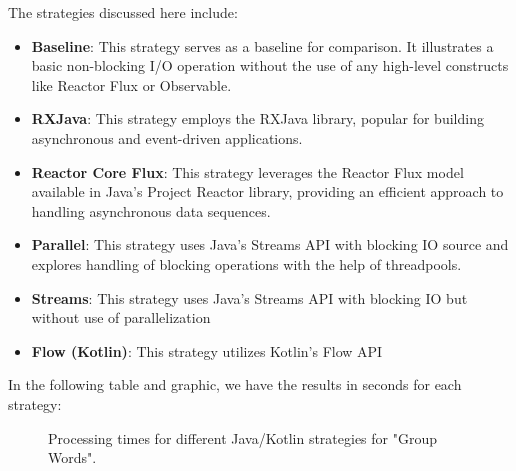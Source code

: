    The strategies discussed here include:
    \begin{itemize}
        \item \textbf{Baseline}: This strategy serves as a baseline for comparison. It illustrates a basic non-blocking I/O operation without the use of any high-level constructs like Reactor Flux or Observable.
        \item \textbf{RXJava}: This strategy employs the RXJava library, popular for building asynchronous and event-driven applications.
        \item \textbf{Reactor Core Flux}: This strategy leverages the Reactor Flux model available in Java's Project Reactor library, providing an efficient approach to handling asynchronous data sequences.
        \item \textbf{Parallel}: This strategy uses Java's Streams API with blocking IO source and explores handling of blocking operations with the help of threadpools.
        \item \textbf{Streams}: This strategy uses Java's Streams API with blocking IO but without use of parallelization
        \item \textbf{Flow (Kotlin)}: This strategy utilizes Kotlin's Flow API
    \end{itemize}

    In the following table and graphic, we have the results in seconds for each strategy:
    \begin{figure}[H]
        \centering
        \caption{Processing times for different Java/Kotlin strategies for "Group Words".}
        \label{fig:group_word_processing_times_java}
    \end{figure}
    
